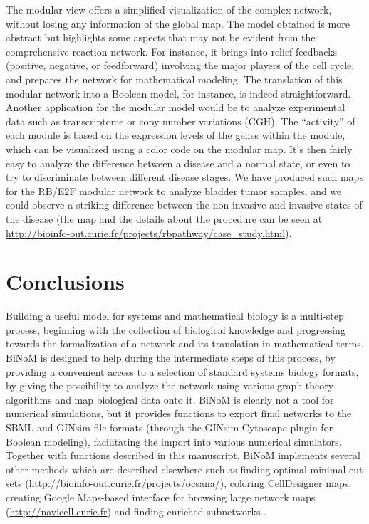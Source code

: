 \documentclass[11pt]{bmc_article_s50}
\newenvironment{bmcformat}{\begin{raggedright}\baselineskip20pt\sloppy\setboolean{publ}{false}}{\end{raggedright}\baselineskip20pt\sloppy}
\begin{document}
\begin{bmcformat}
The modular view offers a simplified visualization of the complex network,
without losing any information of the global map. The
 model obtained is more abstract but highlights some aspects that may not be
evident from the comprehensive reaction network. For instance, it brings into
relief feedbacks (positive, negative, or feedforward) involving the major players of the
cell cycle, and prepares the network for mathematical modeling. The translation
of this modular network into a Boolean model, for instance, is indeed straightforward. Another
application for the modular model would be to analyze experimental data such as
transcriptome or copy number variations (CGH). The ``activity'' of each module
is based on the expression levels of the genes within the module,
which can be visualized using a color code on the modular map. It's then fairly easy to analyze
the difference between a disease and a normal state, or even to try to
discriminate between different disease stages. We have produced such maps for the
RB/E2F modular network to analyze bladder tumor samples, and we could observe a
striking difference between the non-invasive and invasive states of the disease
\cite{calzone2008comprehensive} (the map and the details about the procedure can be seen at
\url{http://bioinfo-out.curie.fr/projects/rbpathway/case_study.html}).

\section*{Conclusions}

Building a useful model for systems and mathematical biology is a multi-step
process, beginning with the collection of biological knowledge and progressing
towards the formalization of a network and its translation in mathematical
terms. BiNoM is designed to help during the intermediate steps of this process,
by providing a convenient access to a selection of standard systems biology
formats, by giving the possibility to analyze the
network using various graph theory algorithms 
and map biological data onto it. BiNoM is clearly not a tool for numerical
simulations, but it provides functions to export final networks to the SBML and
GINsim file formats (through the GINsim Cytoscape plugin for Boolean modeling),
facilitating the import into various numerical simulators. Together with
functions described in this manuscript, BiNoM implements several other methods
which are described elsewhere such as finding optimal minimal cut sets
(\url{http://bioinfo-out.curie.fr/projects/ocsana/}), coloring CellDesigner maps,
creating Google Maps-based interface for browsing large network maps
(\url{http://navicell.curie.fr}) and finding enriched subnetworks \cite{often2012}.



\end{bmcformat}
\end{document}
